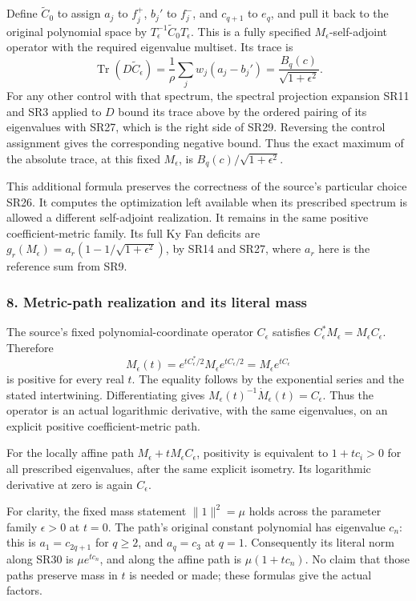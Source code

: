 Define \(\widetilde C_0\) to assign \(a_j\) to \(f_j^+\), \(b_j'\) to \(f_j^-\), and \(c_{q+1}\) to \(e_q\), and pull it back to the original polynomial space by \(T_\epsilon^{-1}\widetilde C_0T_\epsilon\). This is a fully specified \(M_\epsilon\)-self-adjoint operator with the required eigenvalue multiset. Its trace is \[
\operatorname{Tr}(D\widetilde C_\epsilon)
=\frac{1}{\rho}\sum_jw_j(a_j-b_j')
=\frac{B_q(c)}{\sqrt{1+\epsilon^2}}.
\tag{SR29}
\] For any other control with that spectrum, the spectral projection expansion SR11 and SR3 applied to \(D\) bound its trace above by the ordered pairing of its eigenvalues with SR27, which is the right side of SR29. Reversing the control assignment gives the corresponding negative bound. Thus the exact maximum of the absolute trace, at this fixed \(M_\epsilon\), is \(B_q(c)/\sqrt{1+\epsilon^2}\).

This additional formula preserves the correctness of the source's particular choice SR26. It computes the optimization left available when its prescribed spectrum is allowed a different self-adjoint realization. It remains in the same positive coefficient-metric family. Its full Ky Fan deficits are \(g_r(M_\epsilon)=a_r(1-1/\sqrt{1+\epsilon^2})\), by SR14 and SR27, where \(a_r\) here is the reference sum from SR9.

\subsubsection{8. Metric-path realization and its literal mass}\label{endpoint-four_window_sharpness_review--metric-path-realization-and-its-literal-mass}

The source's fixed polynomial-coordinate operator \(C_\epsilon\) satisfies \(C_\epsilon^*M_\epsilon=M_\epsilon C_\epsilon\). Therefore \[
M_\epsilon(t)
=e^{tC_\epsilon^*/2}M_\epsilon e^{tC_\epsilon/2}
=M_\epsilon e^{tC_\epsilon}
\tag{SR30}
\] is positive for every real \(t\). The equality follows by the exponential series and the stated intertwining. Differentiating gives \(M_\epsilon(t)^{-1}\dot M_\epsilon(t)=C_\epsilon\). Thus the operator is an actual logarithmic derivative, with the same eigenvalues, on an explicit positive coefficient-metric path.

For the locally affine path \(M_\epsilon+tM_\epsilon C_\epsilon\), positivity is equivalent to \(1+tc_i>0\) for all prescribed eigenvalues, after the same explicit isometry. Its logarithmic derivative at zero is again \(C_\epsilon\).

For clarity, the fixed mass statement \(\|1\|^2=\mu\) holds across the parameter family \(\epsilon>0\) at \(t=0\). The path's original constant polynomial has eigenvalue \(c_n\): this is \(a_1=c_{2q+1}\) for \(q\ge2\), and \(a_q=c_3\) at \(q=1\). Consequently its literal norm along SR30 is \(\mu e^{tc_n}\), and along the affine path is \(\mu(1+tc_n)\). No claim that those paths preserve mass in \(t\) is needed or made; these formulas give the actual factors.

